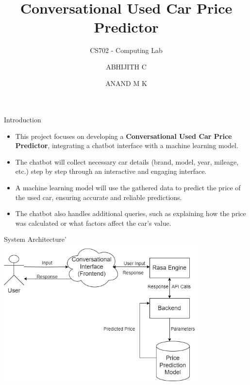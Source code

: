 \documentclass{beamer}
\title{Conversational Used Car Price Predictor}
\subtitle{CS702 - Computing Lab}
\author{ABHIJITH C \and ANAND M K}
\institute{Department of Computer Science and Engineering \\ NITK Surathkal}
\date{}  %
\begin{document}
\begin{frame}[t]
    \titlepage
\end{frame}

\begin{frame}[t]{Introduction}
    \begin{itemize}
        \item This project focuses on developing a \textbf{Conversational Used Car Price Predictor}, integrating a chatbot interface with a machine learning model.
\item The chatbot will collect necessary car details (brand, model, year, mileage, etc.) step by step through an interactive and engaging interface.
        \item A machine learning model will use the gathered data to predict the price of the used car, ensuring accurate and reliable predictions.
        \item The chatbot also handles additional queries, such as explaining how the price was calculated or what factors affect the car’s value.
    \end{itemize}
\end{frame}


\begin{frame}{System Architecture}'
    \centering
   	 \includegraphics[width=0.8\textwidth]{Midsem.drawio.png}
\end{frame}
\end{document}
